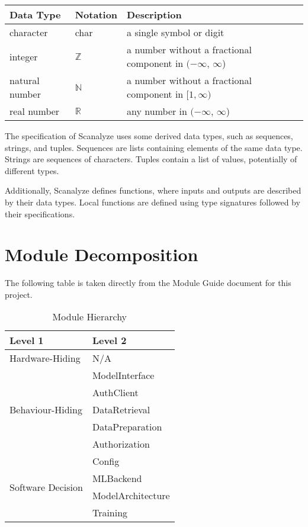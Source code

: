 \documentclass[12pt, titlepage]{article}
\begin{document}
\begin{center}
\renewcommand{\arraystretch}{1.2}
\noindent 
\begin{tabular}{l l p{7.5cm}} 
\toprule 
\textbf{Data Type} & \textbf{Notation} & \textbf{Description}\\ 
\midrule
character & char & a single symbol or digit\\
integer & $\mathbb{Z}$ & a number without a fractional component in $(-\infty$, $\infty$)\\
natural number & $\mathbb{N}$ & a number without a fractional component in $[1, \infty)$\\
real number & $\mathbb{R}$ & any number in $(-\infty$, $\infty$)\\
\bottomrule
\end{tabular} 
\end{center}

The specification of Scanalyze uses some derived data types, such as sequences, strings, and tuples. Sequences are lists containing elements of the same data type. Strings are sequences of characters. Tuples contain a list of values, potentially of different types.

Additionally, Scanalyze defines functions, where inputs and outputs are described by their data types. Local functions are defined using type signatures followed by their specifications.

\section{Module Decomposition}

The following table is taken directly from the Module Guide document for this project.

\begin{table}[h!]
\centering
\begin{tabular}{|p{}|p{}|}
\hline
\textbf{Level 1} & \textbf{Level 2} \\
\hline
Hardware-Hiding & N/A \\
\hline
\multirow{5}{0.4\textwidth}{Behaviour-Hiding} & ModelInterface \\
& AuthClient \\
& DataRetrieval \\
& DataPreparation \\
& Authorization \\
\hline
\multirow{4}{0.4\textwidth}{Software Decision} & Config \\
& MLBackend \\
& ModelArchitecture \\
& Training \\
\hline
\end{tabular}
\caption{Module Hierarchy}
\label{TblMH}
\end{table}
~\newpage
\end{document}
